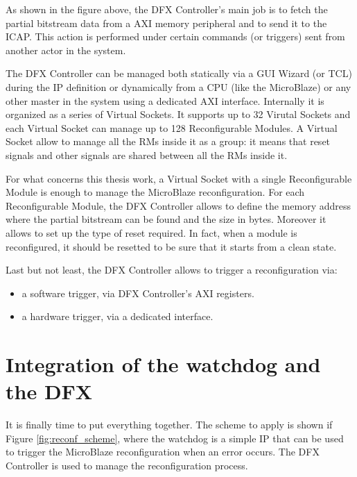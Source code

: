 As shown in the figure above, the DFX Controller's main job is to fetch the partial bitstream data from a AXI memory peripheral and to send it to the ICAP. This action is performed under certain commands (or triggers) sent from another actor in the system.\bigskip

The DFX Controller can be managed both statically via a GUI Wizard (or TCL) during the IP definition or dynamically from a CPU (like the MicroBlaze) or any other master in the system using a dedicated AXI interface. Internally it is organized as a series of Virtual Sockets. It supports up to 32 Virutal Sockets and each Virtual Socket can manage up to 128 Reconfigurable Modules. A Virtual Socket allow to manage all the RMs inside it as a group: it means that reset signals and other signals are shared between all the RMs inside it. \bigskip

For what concerns this thesis work, a Virtual Socket with a single Reconfigurable Module is enough to manage the MicroBlaze reconfiguration. For each Reconfigurable Module, the DFX Controller allows to define the memory address where the partial bitstream can be found and the size in bytes. Moreover it allows to set up the type of reset required. In fact, when a module is reconfigured, it should be resetted to be sure that it starts from a clean state. \bigskip

Last but not least, the DFX Controller allows to trigger a reconfiguration via:
\begin{itemize}
    \item a software trigger, via DFX Controller's AXI registers.
    \item a hardware trigger, via a dedicated interface.
\end{itemize}

\section{Integration of the watchdog and the DFX}
It is finally time to put everything together. The scheme to apply is shown if Figure \ref{fig:reconf_scheme}, where the watchdog is a simple IP that can be used to trigger the MicroBlaze reconfiguration when an error occurs. The DFX Controller is used to manage the reconfiguration process. \bigskip

